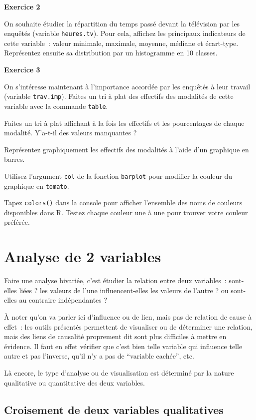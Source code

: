 \documentclass[
  12pt,
]{book}
\begin{document}
\textbf{Exercice 2}

On souhaite étudier la répartition du temps passé devant la télévision par les enquêtés (variable \texttt{heures.tv}). Pour cela, affichez les principaux indicateurs de cette variable~: valeur minimale, maximale, moyenne, médiane et écart-type. Représentez ensuite sa distribution par un histogramme en 10 classes.

\textbf{Exercice 3}

On s'intéresse maintenant à l'importance accordée par les enquêtés à leur travail (variable \texttt{trav.imp}). Faites un tri à plat des effectifs des modalités de cette variable avec la commande \texttt{table}.

Faites un tri à plat affichant à la fois les effectifs et les pourcentages de chaque modalité. Y'a-t-il des valeurs manquantes ?

Représentez graphiquement les effectifs des modalités à l'aide d'un graphique en barres.

Utilisez l'argument \texttt{col} de la fonction \texttt{barplot} pour modifier la couleur du graphique en
\texttt{tomato}.

Tapez \texttt{colors()} dans la console pour afficher l'ensemble des noms de couleurs disponibles dans R. Testez chaque couleur une à une pour trouver votre couleur préférée.

\hypertarget{analyse-de-2-variables}{%
\section{Analyse de 2 variables}\label{analyse-de-2-variables}}

Faire une analyse bivariée, c'est étudier la relation entre deux variables~: sont-elles liées ? les valeurs de l'une influencent-elles les valeurs de l'autre ? ou sont-elles au contraire indépendantes ?

À noter qu'on va parler ici d'influence ou de lien, mais pas de relation de cause à effet~: les outils présentés permettent de visualiser ou de déterminer une relation, mais des liens de causalité proprement dit sont plus difficiles à mettre en évidence. Il faut en effet vérifier que c'est bien telle variable qui influence telle autre et pas l'inverse, qu'il n'y a pas de ``variable cachée'', etc.

Là encore, le type d'analyse ou de visualisation est déterminé par la nature qualitative ou quantitative des deux variables.

\hypertarget{croisement-de-deux-variables-qualitatives}{%
\subsection{Croisement de deux variables qualitatives}\label{croisement-de-deux-variables-qualitatives}}
\end{document}
